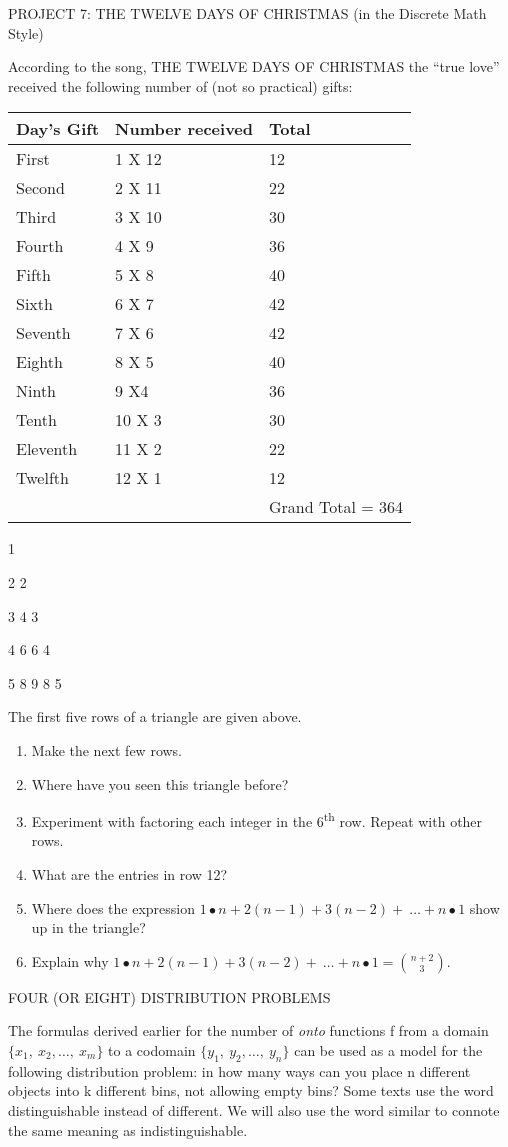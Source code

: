 \documentclass[10pt,letter]{article}
\begin{document}
PROJECT 7: THE TWELVE DAYS OF CHRISTMAS (in the Discrete Math Style)

According to the song, THE TWELVE DAYS OF CHRISTMAS the ``true love''
received the following number of (not so practical) gifts:
\begin{longtable}[]{@{}lll@{}}
\toprule
Day's Gift & Number received & Total\tabularnewline
\midrule
\endhead
First & 1 X 12 & 12\tabularnewline
Second & 2 X 11 & 22\tabularnewline
Third & 3 X 10 & 30\tabularnewline
Fourth & 4 X 9 & 36\tabularnewline
Fifth & 5 X 8 & 40\tabularnewline
Sixth & 6 X 7 & 42\tabularnewline
Seventh & 7 X 6 & 42\tabularnewline
Eighth & 8 X 5 & 40\tabularnewline
Ninth & 9 X4 & 36\tabularnewline
Tenth & 10 X 3 & 30\tabularnewline
Eleventh & 11 X 2 & 22\tabularnewline
Twelfth & 12 X 1 & 12\tabularnewline
& & Grand Total = 364\tabularnewline
\bottomrule

\end{longtable}

1

2 2

3 4 3

4 6 6 4

5 8 9 8 5

The first five rows of a triangle are given above.
\begin{enumerate}
\def\labelenumi{\arabic{enumi}.}

\item
  Make the next few rows.
\item
  Where have you seen this triangle before?
\item
  Experiment with factoring each integer in the 6\textsuperscript{th}
  row. Repeat with other rows.
\item
  What are the entries in row 12?
\item
  Where does the expression
  \(1 \bullet n + 2\left( n - 1 \right) + 3\left( n - 2 \right) + \ \ldots + n \bullet 1\)
  show up in the triangle?
\item
  Explain why
  \(1 \bullet n + 2\left( n - 1 \right) + 3\left( n - 2 \right) + \ \ldots + n \bullet 1 =
\binom{n + 2}{3}
\).

\end{enumerate}

FOUR (OR EIGHT) DISTRIBUTION PROBLEMS

The formulas derived earlier for the number of \emph{onto} functions f
from a domain \(\{ x_{1},\ x_{2},\ldots,\ x_{m}\}\) to a codomain
\(\{ y_{1},\ y_{2},\ldots,\ y_{n}\}\) can be used as a model for the
following distribution problem: in how many ways can you place n
different objects into k different bins, not allowing empty bins? Some
texts use the word distinguishable instead of different. We will also
use the word similar to connote the same meaning as indistinguishable.
\end{document}
